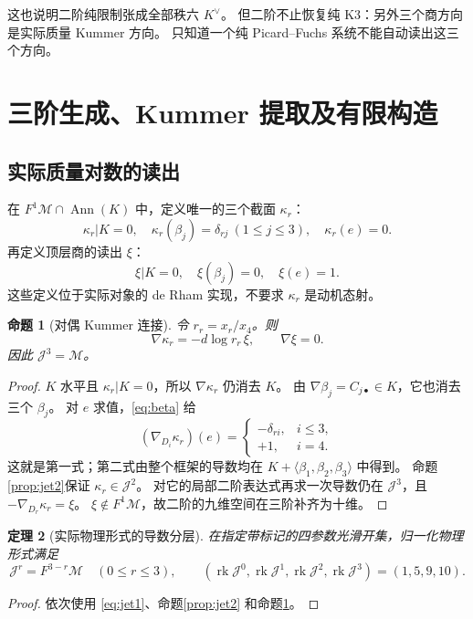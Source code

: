 \documentclass[11pt,a4paper]{ctexart}
\theoremstyle{cnplain}
\newtheorem{theorem}{定理}[section]
\newtheorem{proposition}[theorem]{命题}
\theoremstyle{definition}
\theoremstyle{remark}
\newcommand{\Ann}{\operatorname{Ann}}
\newcommand{\rk}{\operatorname{rk}}
\newcommand{\cM}{\mathcal M}
\begin{document}
这也说明二阶纯限制张成全部秩六 $K^\vee$。
但二阶不止恢复纯 K3：另外三个商方向是实际质量 Kummer 方向。
只知道一个纯 Picard--Fuchs 系统不能自动读出这三个方向。

\section{三阶生成、Kummer 提取及有限构造}
\subsection{实际质量对数的读出}
在 $F^1\cM\cap\Ann(K)$ 中，定义唯一的三个截面 $\kappa_r$：
\begin{equation}\label{eq:kappa}
 \kappa_r|K=0,\quad \kappa_r(\beta_j)=\delta_{rj}\ (1\le j\le3),
 \quad \kappa_r(e)=0.
\end{equation}
再定义顶层商的读出 $\xi$：
\begin{equation}\label{eq:xi}
 \xi|K=0,\quad\xi(\beta_j)=0,\quad\xi(e)=1.
\end{equation}
这些定义位于实际对象的 de Rham 实现，不要求 $\kappa_r$ 是动机态射。

\begin{proposition}[对偶 Kummer 连接]\label{prop:kummer}
令 $r_r=x_r/x_4$。则
\begin{equation}\label{eq:kummerconnection}
 \nabla\kappa_r=-d\log r_r\,\xi,\qquad \nabla\xi=0.
\end{equation}
因此 $\mathcal J^3=\cM$。
\end{proposition}
\begin{proof}
$K$ 水平且 $\kappa_r|K=0$，所以 $\nabla\kappa_r$ 仍消去 $K$。
由 $\nabla\beta_j=C_{j\bullet}\in K$，它也消去三个 $\beta_j$。
对 $e$ 求值，\eqref{eq:beta} 给
\[
 (\nabla_{D_i}\kappa_r)(e)=
 \begin{cases}-\delta_{ri},&i\le3,\\+1,&i=4.\end{cases}
\]
这就是第一式；第二式由整个框架的导数均在 $K+\langle\beta_1,\beta_2,\beta_3\rangle$ 中得到。
命题\ref{prop:jet2}保证 $\kappa_r\in\mathcal J^2$。
对它的局部二阶表达式再求一次导数仍在 $\mathcal J^3$，且 $-\nabla_{D_r}\kappa_r=\xi$。
$\xi\notin F^1\cM$，故二阶的九维空间在三阶补齐为十维。
\end{proof}

\begin{theorem}[实际物理形式的导数分层]\label{thm:jets}
在指定带标记的四参数光滑开集，归一化物理形式满足
\begin{equation}\label{eq:jets}
 \boxed{\mathcal J^r=F^{3-r}\cM\quad(0\le r\le3),
 \qquad (\rk\mathcal J^0,\rk\mathcal J^1,\rk\mathcal J^2,\rk\mathcal J^3)
 =(1,5,9,10).}
\end{equation}
\end{theorem}
\begin{proof}
依次使用 \eqref{eq:jet1}、命题\ref{prop:jet2} 和命题\ref{prop:kummer}。
\end{proof}
\end{document}
